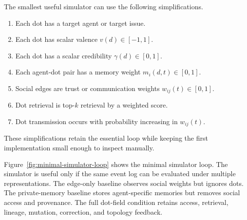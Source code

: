 \documentclass[11pt]{article}
\theoremstyle{remark}
\begin{document}
The smallest useful simulator can use the following simplifications.

\begin{enumerate}[leftmargin=*]
\item Each dot has a target agent or target issue.
\item Each dot has scalar valence $v(d)\in[-1,1]$.
\item Each dot has a scalar credibility $\gamma(d)\in[0,1]$.
\item Each agent-dot pair has a memory weight $m_i(d,t)\in[0,1]$.
\item Social edges are trust or communication weights
$w_{ij}(t)\in[0,1]$.
\item Dot retrieval is top-$k$ retrieval by a weighted score.
\item Dot transmission occurs with probability increasing in
$w_{ij}(t)$.
\end{enumerate}

These simplifications retain the essential loop while keeping the first
implementation small enough to inspect manually.


Figure~\ref{fig:minimal-simulator-loop} shows the minimal simulator loop. The simulator is useful only if the same event log can be evaluated under multiple representations. The edge-only baseline observes social weights but ignores dots. The private-memory baseline stores agent-specific memories but removes social access and provenance. The full dot-field condition retains access, retrieval, lineage, mutation, correction, and topology feedback.
\end{document}
